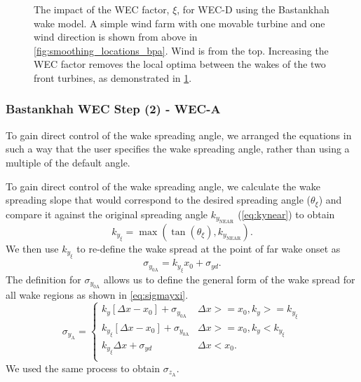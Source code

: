 \documentclass[journal abbreviation, manuscript]{copernicus}
\begin{document}
\begin{figure}[h!]
\begin{subfigure}[t]{0.47\textwidth}
			\caption{}
			\label{fig:smoothing_bpa_wec_d}
		\end{subfigure}
		\caption{The impact of the WEC factor, $\xi$, for WEC-D using the Bastankhah wake model. A simple wind farm with one movable turbine and one wind direction is shown from above in \ref{fig:smoothing_locations_bpa}. Wind is from the top. Increasing the WEC factor removes the local optima between the wakes of the two front turbines, as demonstrated in \ref{fig:smoothing_bpa_wec_d}.}
		\label{fig:wec_bpa_wec_d}
	\end{figure}
	
	\subsubsection{Bastankhah WEC Step (2) - WEC-A}
	To gain direct control of the wake spreading angle, we arranged the equations in such a way that the user specifies the wake spreading angle, rather than using a multiple of the default angle. 
	
	To gain direct control of the wake spreading angle, we calculate the wake spreading slope that would correspond to the desired spreading angle ($\theta_\xi$) and compare  it against the original spreading angle $k_{y_{\text{NEAR}}}$ (\ref{eq:kynear}) to obtain
	\begin{equation}
		k_{y_{\xi}} = \max(\tan{(\theta_\xi)}, k_{y_{\text{NEAR}}}).
	\end{equation}
	We then use $k_{y_{\xi}}$ to re-define the wake spread at the point of far wake onset as
	\begin{equation}\label{eq:sigmay0xi}
		\sigma_{y_{0\text{A}}} = k_{y_{\xi}}x_0+\sigma_{yd}.
	\end{equation}
	The definition for $\sigma_{y_{0\text{A}}}$ allows us to define the general form of the wake spread for all wake regions as shown in \ref{eq:sigmayxi}. 
	\begin{equation}\label{eq:sigmayxi}
		\sigma_{y_{\text{A}}} =
		\begin{cases} k_y [\Delta x-x_0]+\sigma_{y_{0\text{A}}} & \Delta x >= x_0, k_y >= k_{y_{\xi}} \\
			k_{y_{\xi}} [\Delta x-x_0]+\sigma_{y_{0\text{A}}} & \Delta x >= x_0, k_y < k_{y_{\xi}} \\
			k_{y_{\xi}}\Delta x+\sigma_{yd} & \Delta x < x_0. \\
		\end{cases}
	\end{equation}
	We used the same process to obtain $\sigma_{z_{\text{A}}}$. 
	
\end{document}
